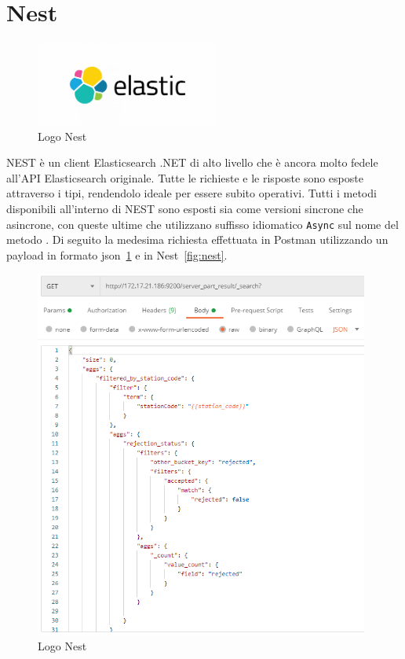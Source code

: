 \section{Nest}
\begin{figure}[ht!]
\begin{center}
  \includegraphics[width=6cm]{images/elastic.png}
  \caption{Logo Nest}
\end{center}
\end{figure}
NEST è un client Elasticsearch .NET di alto livello che è ancora molto fedele all'API Elasticsearch originale. Tutte le richieste e le risposte sono esposte attraverso i tipi, rendendolo ideale per essere subito operativi.
Tutti i metodi disponibili all'interno di NEST sono esposti sia come versioni sincrone che asincrone, con queste ultime che utilizzano suffisso idiomatico \verb|Async| sul nome del metodo \cite{Nest}.
Di seguito la medesima richiesta effettuata in Postman utilizzando un payload in formato json~\ref{fig:json} e in Nest~\ref{fig:nest}.
\pagebreak
\begin{figure}[ht!]
\begin{center}
  \includegraphics[width=11cm]{images/json.png}
  \caption{Logo Nest}
  \label{fig:json}
\end{center}
\end{figure}
